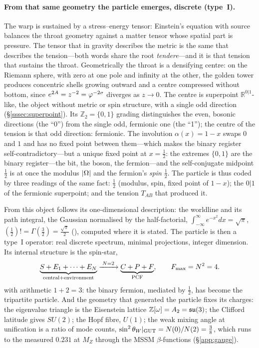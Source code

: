 \paragraph{From that same geometry the particle emerges, discrete (type~I).}
The warp is sustained by a stress--energy tensor: Einstein's equation with source balances
the throat geometry against a matter tensor whose spatial part is pressure. The tensor that
in gravity describes the metric is the same that describes the tension---both words share
the root \emph{tendere}---and it is that tension that sustains the throat. Geometrically the
throat is a densifying centre: on the Riemann sphere, with zero at one pole and infinity at
the other, the golden tower produces concentric shells growing outward and a centre
compressed without bottom, since $e^{2A}=z^{-2}=\varphi^{-2\sigma}$ diverges as $z\to0$. The
centre is superpoint $\mathbb{R}^{0|1}$-like, the object without metric or spin structure,
with a single odd direction (\S\ref{sssec:superpoint}). Its $\mathbb{Z}_2=\{0,1\}$ grading
distinguishes the even, bosonic directions (the ``0'') from the single odd, fermionic one
(the ``1''); the centre of the tension is that odd direction: fermionic. The involution
$\alpha(x)=1-x$ swaps $0$ and $1$ and has no fixed point between them---which makes the
binary register self-contradictory---but a unique fixed point at $x=\tfrac12$: the extremes
$\{0,1\}$ are the binary register---the bit, the boson, the fermion---and the self-conjugate
midpoint $\tfrac12$ is at once the modulus $|\Omega|$ and the fermion's \emph{spin} $\tfrac12$.
The particle is thus coded by three readings of the same fact: $\tfrac12$ (modulus, spin,
fixed point of $1-x$); the $0|1$ of the fermionic superpoint; and the tension $T_{AB}$ that
produced it.

From this object follows its one-dimensional description: the worldline and its path
integral, the Gaussian normalised by the half-factorial,
$\int_{-\infty}^{\infty}e^{-x^2}dx=\sqrt\pi$, $(\tfrac12)!=\Gamma(\tfrac32)=\tfrac{\sqrt\pi}{2}$
(), computed where it is stated. The particle is then a type~I
operator: real discrete spectrum, minimal projections, integer dimension. Its internal
structure is the spin-star,
\begin{equation}\label{eq:obs-spinstar}
  \underbrace{S+E_1+\cdots+E_N}_{\text{central}+\text{environment}}
   \xrightarrow{\;N=2\;}\underbrace{C+P+F}_{\text{PCF}},\qquad F_{\max}=N^{2}=4 .
\end{equation}
with arithmetic $1+2=3$: the binary fermion, mediated by $\tfrac12$, has become the
tripartite particle. And the geometry that generated the particle fixes its charges: the
eigenvalue triangle is the Eisenstein lattice $\mathbb{Z}[\omega]=A_2=\mathfrak{su}(3)$; the Clifford
latitude gives $SU(2)$; the Hopf fibre, $U(1)$; the weak mixing angle at
unification is a ratio of mode counts, $\sin^2\theta_W|_{\rm GUT}=N(0)/N(2)=\tfrac38$, which runs
to the measured $0.231$ at $M_Z$ through the MSSM $\beta$-functions
(\S\ref{app:gauge}).

